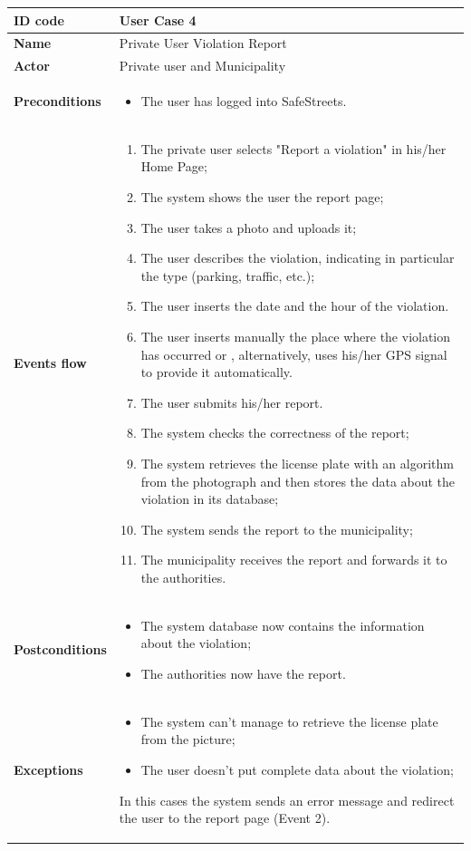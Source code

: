 \documentclass[titlepage]{article}
\begin{document}
\begin{longtable}{| p{3 cm} | p{10 cm} |} 
\hline

\textbf{ID code} & User Case 4 \\ \hline
\textbf{Name} & Private User Violation Report \\ \hline
\textbf{Actor} & Private user and Municipality\\ \hline
\textbf{Preconditions} & 
\begin{itemize}
\item The user has logged into SafeStreets.
\end{itemize} \\ \hline
\textbf{Events flow} &
\begin{enumerate}
\item The private user selects "Report a violation" in his/her Home Page;
\item The system shows the user the report page;
\item The user takes a photo and uploads it;
\item The user describes the violation, indicating in particular the type (parking, traffic, etc.);
\item The user inserts the date and the hour of the violation.
\item The user inserts manually the place where the violation has occurred or , alternatively, uses his/her GPS signal to provide it automatically.
\item The user submits his/her report.
\item The system checks the correctness of the report;
\item The system retrieves the license plate with an algorithm from the photograph and then stores the data about the violation in its database;
\item The system sends the report to the municipality;
\item The municipality receives the report and forwards it to the authorities.
\end{enumerate} \\ \hline
\textbf{Postconditions} & 
\begin{itemize}
\item The system database now contains the information about the violation;
\item The authorities now have the report.
\end{itemize} \\ \hline
\textbf{Exceptions} & 
\begin{itemize}
\item The system can't manage to retrieve the license plate from the picture;
\item The user doesn't put complete data about the violation; 
\end{itemize}
In this cases the system sends an error message and redirect the user to the report page (Event 2). \\ \hline
\end{longtable}
\end{document}
